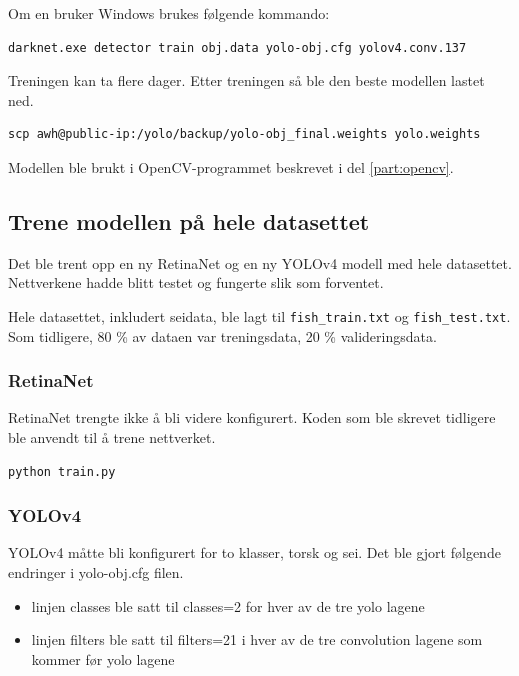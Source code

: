 Om en bruker Windows brukes følgende kommando:

\begin{verbatim}
darknet.exe detector train obj.data yolo-obj.cfg yolov4.conv.137
\end{verbatim}

Treningen kan ta flere dager. Etter treningen så ble den beste modellen lastet ned.

\begin{verbatim}
scp awh@public-ip:/yolo/backup/yolo-obj_final.weights yolo.weights
\end{verbatim}

Modellen ble brukt i OpenCV-programmet beskrevet i del \ref{part:opencv}. 

\subsection{Trene modellen på hele datasettet}

Det ble trent opp en ny RetinaNet og en ny YOLOv4 modell med hele datasettet. Nettverkene hadde blitt testet og fungerte slik som forventet.

Hele datasettet, inkludert seidata, ble lagt til \texttt{fish\_train.txt} og \texttt{fish\_test.txt}. Som tidligere, 80 \% av dataen var treningsdata, 20 \% valideringsdata.

\subsubsection{RetinaNet}

RetinaNet trengte ikke å bli videre konfigurert. Koden som ble skrevet tidligere ble anvendt til å trene nettverket.

\begin{verbatim}
python train.py
\end{verbatim}

\subsubsection{YOLOv4}

YOLOv4 måtte bli konfigurert for to klasser, torsk og sei. Det ble gjort følgende endringer i yolo-obj.cfg filen.

\begin{itemize}
  \item linjen classes ble satt til classes=2 for hver av de tre yolo lagene
  \item linjen filters ble satt til filters=21 i hver av de tre convolution lagene som kommer før yolo lagene
\end{itemize}

